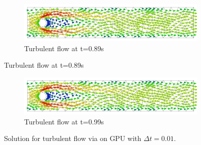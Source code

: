 \begin{figure}[H]
	\ContinuedFloat
	\begin{subfigure}{\textwidth}
    \includegraphics[width=\textwidth]{Figures/numerical_results/turbulent_gpu/turbulent_velocity_field_89.svg.pdf}
    \caption{Turbulent flow at t=0.89s}
        \end{subfigure}
\end{figure}

\begin{figure}[H]
	\ContinuedFloat
	\begin{subfigure}{\textwidth}
    \includegraphics[width=\textwidth]{Figures/numerical_results/turbulent_gpu/turbulent_velocity_field_99.svg.pdf}
    \caption{Turbulent flow at t=0.99s}
	\end{subfigure}
	\caption{Solution for turbulent flow via  on GPU with $\Delta t = 0.01$.}
\end{figure}


